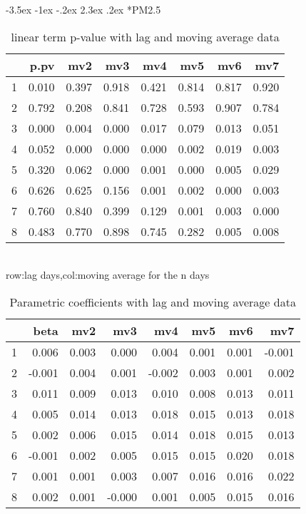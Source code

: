 \documentclass[a4paper, 12pt]{article}
\makeatletter
\def\large{\fontsize{14}{20}\selectfont}
\renewcommand\subsection{\@startsection {subsection}{1}{\z@}%
                                   {-3.5ex \@plus -1ex \@minus -.2ex}%
                                   {2.3ex \@plus.2ex}%
                                   {\centering\normalfont\large\bfseries}}
\makeatother
\begin{document}
\clearpage
\subsection*{PM2.5}
\begin{table}[h]
\centering
\caption{linear term p-value with lag and moving average data}
\begin{tabular}{rrrrrrrr}
  \hline
 & p.pv & mv2 & mv3 & mv4 & mv5 & mv6 & mv7 \\
  \hline
1 & 0.010 & 0.397 & 0.918 & 0.421 & 0.814 & 0.817 & 0.920 \\
  2 & 0.792 & 0.208 & 0.841 & 0.728 & 0.593 & 0.907 & 0.784 \\
  3 & 0.000 & 0.004 & 0.000 & 0.017 & 0.079 & 0.013 & 0.051 \\
  4 & 0.052 & 0.000 & 0.000 & 0.000 & 0.002 & 0.019 & 0.003 \\
  5 & 0.320 & 0.062 & 0.000 & 0.001 & 0.000 & 0.005 & 0.029 \\
  6 & 0.626 & 0.625 & 0.156 & 0.001 & 0.002 & 0.000 & 0.003 \\
  7 & 0.760 & 0.840 & 0.399 & 0.129 & 0.001 & 0.003 & 0.000 \\
  8 & 0.483 & 0.770 & 0.898 & 0.745 & 0.282 & 0.005 & 0.008 \\
   \hline
\end{tabular}
\\row:lag days,col:moving average for the n days
\end{table}

\begin{table}[h]
\centering
\caption{Parametric coefficients with lag and moving average data}
\begin{tabular}{rrrrrrrr}
  \hline
 & beta & mv2 & mv3 & mv4 & mv5 & mv6 & mv7 \\
  \hline
1 & 0.006 & 0.003 & 0.000 & 0.004 & 0.001 & 0.001 & -0.001 \\
  2 & -0.001 & 0.004 & 0.001 & -0.002 & 0.003 & 0.001 & 0.002 \\
  3 & 0.011 & 0.009 & 0.013 & 0.010 & 0.008 & 0.013 & 0.011 \\
  4 & 0.005 & 0.014 & 0.013 & 0.018 & 0.015 & 0.013 & 0.018 \\
  5 & 0.002 & 0.006 & 0.015 & 0.014 & 0.018 & 0.015 & 0.013 \\
  6 & -0.001 & 0.002 & 0.005 & 0.015 & 0.015 & 0.020 & 0.018 \\
  7 & 0.001 & 0.001 & 0.003 & 0.007 & 0.016 & 0.016 & 0.022 \\
  8 & 0.002 & 0.001 & -0.000 & 0.001 & 0.005 & 0.015 & 0.016 \\
   \hline
\end{tabular}
\end{table}
\clearpage
\end{document}
